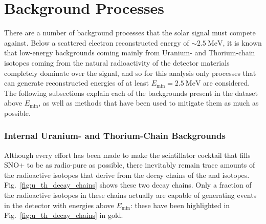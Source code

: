 \section{Background Processes}\label{sec:background_processes}
There are a number of background processes that the solar signal must compete against. Below a scattered electron reconstructed energy of $\sim\SI{2.5}{\MeV}$, it is known that low-energy backgrounds coming mainly from Uranium- and Thorium-chain isotopes coming from the natural radioactivity of the detector materials completely dominate over the \beight{} signal, and so for this analysis only processes that can generate reconstructed energies of at least $E_{\textrm{min}} = \SI{2.5}{\MeV}$ are considered. The following subsections explain each of the backgrounds present in the dataset above $E_{\mathrm{min}}$, as well as methods that have been used to mitigate them as much as possible.

\subsubsection{Internal Uranium- and Thorium-Chain Backgrounds}\label{sec:u_th_internals}
Although every effort has been made to make the scintillator cocktail that fills SNO+ to be as radio-pure as possible, there inevitably remain trace amounts of the radioactive isotopes that derive from the decay chains of the  and  isotopes. Fig.~\ref{fig:u_th_decay_chains} shows these two decay chains. Only a fraction of the radioactive isotopes in these chains actually are capable of generating events in the detector with energies above $E_{\textrm{min}}$: these have been highlighted in Fig.~\ref{fig:u_th_decay_chains} in gold.

